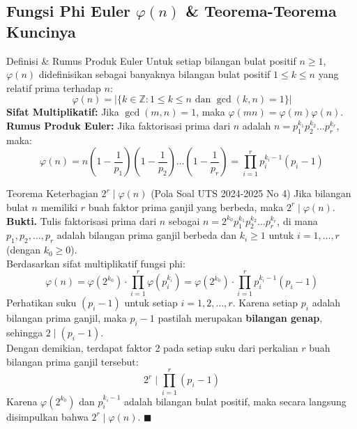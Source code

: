 \documentclass[11pt,a4paper]{article}
\newenvironment{proof}{\noindent\textbf{Bukti.}}{\hfill$\blacksquare$\vspace{0.3em}}
\begin{document}
\subsection{Fungsi Phi Euler \texorpdfstring{$\varphi(n)$}{Phi(n)} \& Teorema-Teorema Kuncinya}
\begin{thmbox}{Definisi \& Rumus Produk Euler}
Untuk setiap bilangan bulat positif $n \ge 1$, $\varphi(n)$ didefinisikan sebagai banyaknya bilangan bulat positif $1 \le k \le n$ yang relatif prima terhadap $n$:
\[
\varphi(n) = |\{k \in \mathbb{Z} : 1 \le k \le n \text{ dan } \gcd(k, n) = 1\}|
\]
\textbf{Sifat Multiplikatif:} Jika $\gcd(m, n) = 1$, maka $\varphi(m n) = \varphi(m) \varphi(n)$.\\
\textbf{Rumus Produk Euler:} Jika faktorisasi prima dari $n$ adalah $n = p_1^{k_1} p_2^{k_2} \dots p_r^{k_r}$, maka:
\[
\varphi(n) = n \left(1 - \frac{1}{p_1}\right) \left(1 - \frac{1}{p_2}\right) \dots \left(1 - \frac{1}{p_r}\right) = \prod_{i=1}^r p_i^{k_i - 1}(p_i - 1)
\]
\end{thmbox}

\begin{thmbox}{Teorema Keterbagian $2^r \mid \varphi(n)$ (Pola Soal UTS 2024-2025 No 4)}
Jika bilangan bulat $n$ memiliki $r$ buah faktor prima ganjil yang berbeda, maka $2^r \mid \varphi(n)$.
\begin{proof}
Tulis faktorisasi prima dari $n$ sebagai $n = 2^{k_0} p_1^{k_1} p_2^{k_2} \dots p_r^{k_r}$, di mana $p_1, p_2, \dots, p_r$ adalah bilangan prima ganjil berbeda dan $k_i \ge 1$ untuk $i = 1, \dots, r$ (dengan $k_0 \ge 0$).\\
Berdasarkan sifat multiplikatif fungsi phi:
\[
\varphi(n) = \varphi(2^{k_0}) \cdot \prod_{i=1}^r \varphi(p_i^{k_i}) = \varphi(2^{k_0}) \cdot \prod_{i=1}^r p_i^{k_i - 1}(p_i - 1)
\]
Perhatikan suku $(p_i - 1)$ untuk setiap $i = 1, 2, \dots, r$. Karena setiap $p_i$ adalah bilangan prima ganjil, maka $p_i - 1$ pastilah merupakan \textbf{bilangan genap}, sehingga $2 \mid (p_i - 1)$.\\
Dengan demikian, terdapat faktor 2 pada setiap suku dari perkalian $r$ buah bilangan prima ganjil tersebut:
\[
2^r \;\Big|\; \prod_{i=1}^r (p_i - 1)
\]
Karena $\varphi(2^{k_0})$ dan $p_i^{k_i - 1}$ adalah bilangan bulat positif, maka secara langsung disimpulkan bahwa $2^r \mid \varphi(n)$.
\end{proof}
\end{thmbox}
\end{document}
